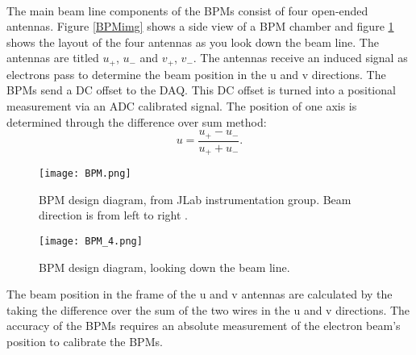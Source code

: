  \paragraph{} The main beam line components of the BPMs consist of four open-ended antennas. Figure \ref{BPMimg} shows a side view of a BPM chamber and figure \ref{BPM_4} shows the layout of the four antennas as you look down the beam line. The antennas are titled $u_+$, $u_-$ and $v_+$, $v_-$. The antennas receive an induced signal as electrons pass to determine the beam position in the u and v directions. The BPMs send a DC offset to the DAQ. This DC offset is turned into a positional measurement via an ADC calibrated signal. The position of one axis is determined through the difference over sum method:
 \begin{equation}
 	u = \frac{u_+ - u_-}{u_+ + u_-}.
 \end{equation} 
  	\begin{figure}[]
 	\centering
 	\texttt{[image: BPM.png]} 
 	\caption{BPM design diagram, from JLab instrumentation	group. Beam direction is from left to right \cite{BPM2}. }
 	\label{BPMimg}
	\vspace{1.5cm}
	\centering
 	\texttt{[image: BPM\_4.png]}  	
 	\caption{BPM design diagram, looking down the beam line\cite{BPM2}. }
 	\label{BPM_4}
 \end{figure} 
  
The beam position in the frame of the u and v antennas are calculated by the taking the difference over the sum of the two wires in the u and v directions. The accuracy of the BPMs requires an absolute measurement of the electron beam's position to calibrate the BPMs\cite{BPM,BPM2}.

